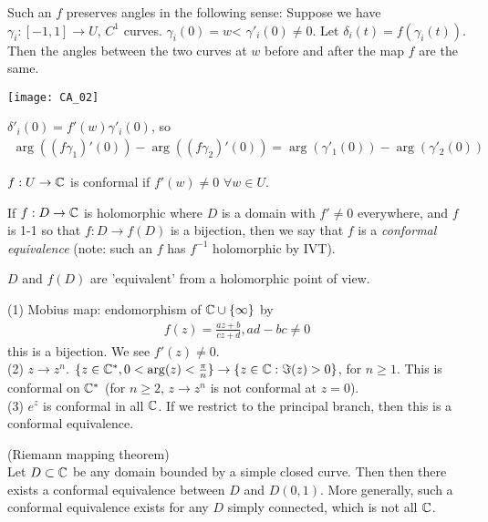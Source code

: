 \documentclass[a4paper]{article}
\begin{document}
Such an $f$ preserves angles in the following sense: Suppose we have $\gamma_i: [-1,1] \to U$, $C^1$ curves. $\gamma_i(0) = w$< $\gamma'_i(0) \neq 0$. Let $\delta_i(t) = f(\gamma_i(t))$. Then the angles between the two curves at $w$ before and after the map $f$ are the same.

\texttt{[image: CA\_02]}

$\delta'_i(0) = f'(w) \gamma'_i(0)$, so
\begin{equation*}
\begin{aligned}
\arg((f \gamma_1)'(0)) - \arg((f\gamma_2)'(0)) = \arg(\gamma'_1(0)) - \arg(\gamma'_2(0))
\end{aligned}
\end{equation*}

\begin{defi}
$f: U \to \mathbb{C}$ is conformal if $f'(w) \neq 0$ $\forall w \in U$.
\end{defi}

\begin{defi}
If $f:D \to \mathbb{C}$ is holomorphic where $D$ is a domain with $f' \neq 0$ everywhere, and $f$ is 1-1 so that $f:D \to f(D)$ is a bijection, then we say that $f$ is a \emph{conformal equivalence} (note: such an $f$ has $f^{-1}$ holomorphic by IVT).

$D$ and $f(D)$ are 'equivalent' from a holomorphic point of view.
\end{defi}

\begin{eg}
(1) Mobius map: endomorphism of $\mathbb{C} \cup \{\infty\}$ by
\begin{equation*}
\begin{aligned}
f(z) = \frac{az + b}{cz + d}, ad-bc \neq 0
\end{aligned}
\end{equation*}
this is a bijection. We see $f'(z) \neq 0$.\\
(2) $z \to z^n$. $\{z \in \mathbb{C}^*, 0 <\arg(z) < \frac{\pi}{n}\} \to \{z \in \mathbb{C}: \Im(z) > 0\}$, for $n \geq 1$. This is conformal on $\mathbb{C}^*$ (for $n \geq 2$, $z \to z^n$ is not conformal at $z=0$).\\
(3) $e^z$ is conformal in all $\mathbb{C}$. If we restrict to the principal branch, then this is a conformal equivalence.
\end{eg}

\begin{thm} (Riemann mapping theorem)\\
Let $D \subset \mathbb{C}$ be any domain bounded by a simple closed curve. Then then there exists a conformal equivalence between $D$ and $D(0,1)$. More generally, such a conformal equivalence exists for any $D$ simply connected, which is not all $\mathbb{C}$.
\end{thm}
\end{document}
